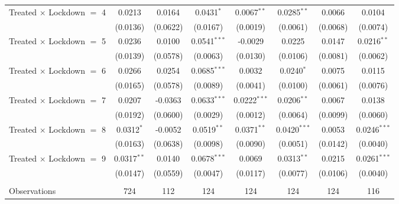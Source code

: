 \begin{tabular}{lccccccc}
   Treated $\times$ Lockdown $=$ 4   & 0.0213        & 0.0164        & 0.0431$^{*}$    & 0.0067$^{**}$   & 0.0285$^{**}$          & 0.0066        & 0.0104\\   
                                     & (0.0136)      & (0.0622)      & (0.0167)        & (0.0019)        & (0.0061)               & (0.0068)      & (0.0074)\\   
   Treated $\times$ Lockdown $=$ 5   & 0.0236        & 0.0100        & 0.0541$^{***}$  & -0.0029         & 0.0225                 & 0.0147        & 0.0216$^{**}$\\   
                                     & (0.0139)      & (0.0578)      & (0.0063)        & (0.0130)        & (0.0106)               & (0.0081)      & (0.0062)\\   
   Treated $\times$ Lockdown $=$ 6   & 0.0266        & 0.0254        & 0.0685$^{***}$  & 0.0032          & 0.0240$^{*}$           & 0.0075        & 0.0115\\   
                                     & (0.0165)      & (0.0578)      & (0.0089)        & (0.0041)        & (0.0100)               & (0.0061)      & (0.0076)\\   
   Treated $\times$ Lockdown $=$ 7   & 0.0207        & -0.0363       & 0.0633$^{***}$  & 0.0222$^{***}$  & 0.0206$^{**}$          & 0.0067        & 0.0138\\   
                                     & (0.0192)      & (0.0600)      & (0.0029)        & (0.0012)        & (0.0064)               & (0.0099)      & (0.0060)\\   
   Treated $\times$ Lockdown $=$ 8   & 0.0312$^{*}$  & -0.0052       & 0.0519$^{**}$   & 0.0371$^{**}$   & 0.0420$^{***}$         & 0.0053        & 0.0246$^{***}$\\   
                                     & (0.0163)      & (0.0638)      & (0.0098)        & (0.0090)        & (0.0051)               & (0.0142)      & (0.0040)\\   
   Treated $\times$ Lockdown $=$ 9   & 0.0317$^{**}$ & 0.0140        & 0.0678$^{***}$  & 0.0069          & 0.0313$^{**}$          & 0.0215        & 0.0261$^{***}$\\   
                                     & (0.0147)      & (0.0559)      & (0.0047)        & (0.0117)        & (0.0077)               & (0.0106)      & (0.0040)\\   
    \\
   Observations                      & 724           & 112           & 124             & 124             & 124                    & 124           & 116\\  

\end{tabular}
